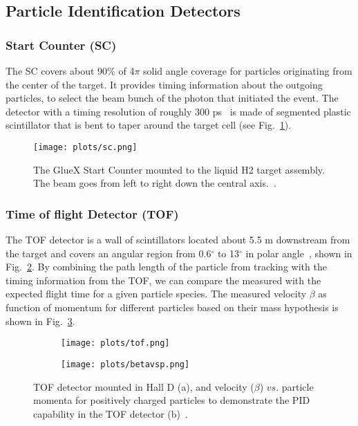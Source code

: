 {\subsection{Particle Identification Detectors}
\label{p.2.2.1}

\subsubsection{Start Counter (SC)}
The SC covers about 90$\%$ of 4$\pi$ solid angle coverage for particles originating from the center of the target. It provides timing information about the outgoing particles, to select the beam bunch of the photon that initiated the event. The detector with a timing resolution of roughly 300 ps~\cite{GlueX97} is made of segmented plastic scintillator that is bent to taper around the target cell (see Fig.~\ref{fig.2.2.1.1}).

\begin{figure}[H]
    \centering
        \texttt{[image: plots/sc.png]}
        \caption{The GlueX Start Counter mounted to the liquid H2 target assembly. The beam goes from left to right down the central axis.~\cite{GlueX97}.}
        \label{fig.2.2.1.1}
\end{figure}

\subsubsection{Time of flight Detector (TOF)}
The TOF detector is a wall of scintillators located about 5.5 m downstream from the target and covers an angular region from 0.6$^{\circ}$ to 13$^{\circ}$ in polar angle~\cite{GlueX97}, shown in Fig.~\ref{fig.2.2.1.2.a}. By combining the path length of the particle from tracking with the timing information from the TOF, we can compare the measured with the expected flight time for a given particle species. The measured velocity $\beta$ as function of momentum for different particles based on their mass hypothesis is shown in Fig.~\ref{fig.2.2.1.2.b}.

\begin{figure}[H]
    \centering
    \begin{subfigure}[H]{0.5\textwidth}
        \texttt{[image: plots/tof.png]}
        \caption{}
        \label{fig.2.2.1.2.a}
    \end{subfigure}\vfill
    \begin{subfigure}[H]{0.6\textwidth}
        \texttt{[image: plots/betavsp.png]}
        \caption{}
        \label{fig.2.2.1.2.b}
        \vspace{1pt}
    \end{subfigure}
    \caption{TOF detector mounted in Hall D (a), and velocity ($\beta$) $vs.$ particle momenta for positively charged particles to demonstrate the PID capability in the TOF detector (b)~\cite{Ghoul16}.}
    \label{fig.4.2.2}
\end{figure}

}
